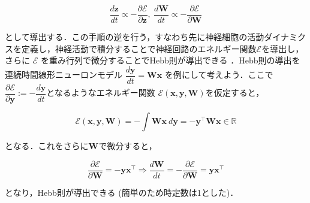 \begin{equation}
\frac{d \mathbf{z}}{dt}\propto-\frac{\partial \mathcal{E}}{\partial \mathbf{z}},\ \frac{d \mathbf{W}}{dt}\propto-\frac{\partial \mathcal{E}}{\partial \mathbf{W}}
\end{equation}


として導出する．この手順の逆を行う，すなわち先に神経細胞の活動ダイナミクスを定義し，神経活動で積分することで神経回路のエネルギー関数$\mathcal{E}$を導出し，さらに $\mathcal{E}$ を重み行列で微分することでHebb則が導出できる \cite{Isomura2020-sn}．Hebb則の導出を連続時間線形ニューロンモデル $\dfrac{d\mathbf{y}}{dt}=\mathbf{W}\mathbf{x}$ を例にして考えよう．ここで$\dfrac{\partial\mathcal{E}}{\partial\mathbf{y}}:=-\dfrac{d\mathbf{y}}{dt}$となるようなエネルギー関数 $\mathcal{E}(\mathbf{x}, \mathbf{y}, \mathbf{W})$を仮定すると，


\begin{equation}
\mathcal{E}(\mathbf{x}, \mathbf{y}, \mathbf{W})=-\int \mathbf{W}\mathbf{x}\ d\mathbf{y}=-\mathbf{y}^\top \mathbf{W}\mathbf{x} \in \mathbb{R}
\end{equation}


となる．これをさらに$\mathbf{W}$で微分すると，


\begin{equation}
\dfrac{\partial\mathcal{E}}{\partial\mathbf{W}}=-\mathbf{y}\mathbf{x}^\top\Rightarrow
\frac{d\mathbf{W}}{dt}=-\dfrac{\partial\mathcal{E}}{\partial\mathbf{W}}=\mathbf{y}\mathbf{x}^\top
\end{equation}


となり，Hebb則が導出できる (簡単のため時定数は1とした)．
